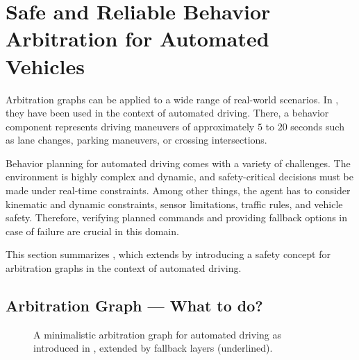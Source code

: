 \section{Safe and Reliable Behavior Arbitration for Automated Vehicles}




Arbitration graphs can be applied to a wide range of real-world scenarios.
In \cite{orzechowskiDecisionMakingAutomatedVehicles2020},
they have been used in the context of automated driving.
There, a behavior component represents driving maneuvers of approximately $5$ to $20$ seconds
such as lane changes, parking maneuvers, or crossing intersections.

Behavior planning for automated driving comes with a variety of challenges.
The environment is highly complex and dynamic, and safety-critical decisions must be made under real-time constraints.
Among other things, the agent has to consider kinematic and dynamic constraints,
sensor limitations, traffic rules, and vehicle safety.
Therefore, verifying planned commands and providing fallback options in case of failure are crucial in this domain.

This section summarizes \cite{orzechowskiVerhaltensentscheidungFuerAutomatisierte2023},
which extends \cite{orzechowskiDecisionMakingAutomatedVehicles2020} by
introducing a safety concept for arbitration graphs in the context of automated driving.




\subsection{Arbitration Graph --- \textbf{What} to do?}

\begin{figure}
    \centering
    
    \caption{
        A minimalistic arbitration graph for automated driving as introduced in \cite{orzechowskiDecisionMakingAutomatedVehicles2020}, extended by fallback layers (underlined).
    }
    \label{fig:arbitration-graph-evaluation}
\end{figure}

